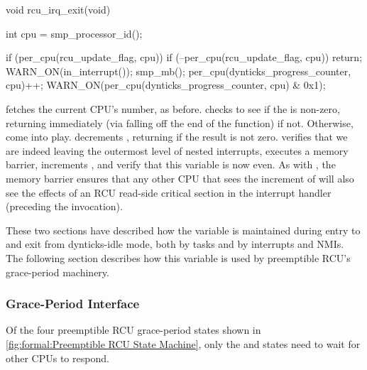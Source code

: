 \begin{fcvlabel}
\begin{VerbatimN}[commandchars=\\\[\]]
void rcu_irq_exit(void)
{
	int cpu = smp_processor_id();	\lnlbl[fetch]

	if (per_cpu(rcu_update_flag, cpu)) { 
		if (--per_cpu(rcu_update_flag, cpu)) 
			return;
		WARN_ON(in_interrupt());	\lnlbl[verify]
		smp_mb();			\lnlbl[mb]
		per_cpu(dynticks_progress_counter, cpu)++; 
		WARN_ON(per_cpu(dynticks_progress_counter, 
		                cpu) & 0x1); 
	}
}
\end{VerbatimN}
\end{fcvlabel}

\begin{fcvref}
 fetches the current CPU's number, as before.
 checks to see if the  is
non-zero, returning immediately (via falling off the end of the
function) if not.
Otherwise,  come into play.
 decrements , returning
if the result is not zero.
 verifies that we are indeed leaving the outermost
level of nested interrupts,  executes a memory barrier,
 increments ,
and  verify that this
variable is now even.
As with , the memory barrier ensures that
any other CPU that sees the increment of
will also see the effects of an RCU read-side critical section
in the interrupt handler (preceding the 
invocation).
\end{fcvref}

These two sections have described how the
 variable is maintained during
entry to and exit from dynticks-idle mode, both by tasks and by
interrupts and NMIs.
The following section describes how this variable is used by
preemptible RCU's grace-period machinery.

\subsubsection{Grace-Period Interface}
\label{sec:formal:Grace-Period Interface}

Of the four preemptible RCU grace-period states shown in
\cref{fig:formal:Preemptible RCU State Machine},
only the 
and  states need to wait
for other CPUs to respond.

